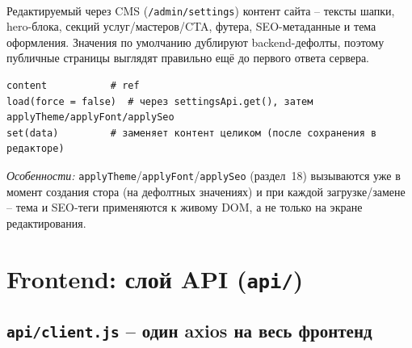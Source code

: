 \paragraph{}
Редактируемый через CMS (\texttt{/admin/settings}) контент сайта --
тексты шапки, hero-блока, секций услуг/мастеров/CTA, футера,
SEO-метаданные и тема оформления. Значения по умолчанию дублируют
backend-дефолты, поэтому публичные страницы выглядят правильно ещё до
первого ответа сервера.
\begin{verbatim}
content           # ref
load(force = false)  # через settingsApi.get(), затем applyTheme/applyFont/applySeo
set(data)         # заменяет контент целиком (после сохранения в редакторе)
\end{verbatim}
\textit{Особенности:} \texttt{applyTheme}/\texttt{applyFont}/\texttt{applySeo}
(раздел~18) вызываются уже в момент создания стора (на дефолтных
значениях) и при каждой загрузке/замене -- тема и SEO-теги применяются к
живому DOM, а не только на экране редактирования.

\section{Frontend: слой API (\texttt{api/})}

\subsection{\texttt{api/client.js} -- один axios на весь фронтенд}

